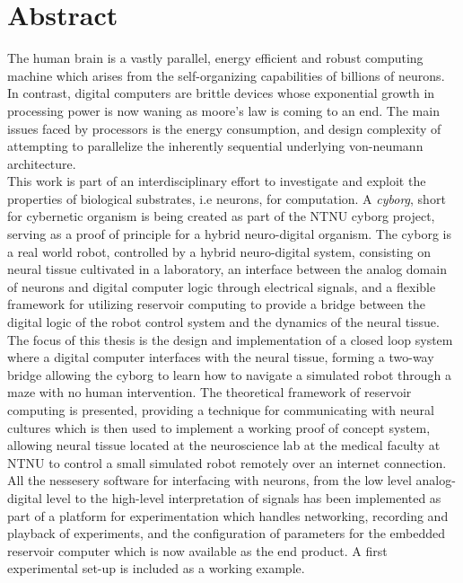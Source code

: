 \section*{\Huge Abstract}
The human brain is a vastly parallel, energy efficient and robust computing
machine which arises from the self-organizing capabilities of billions of neurons.
In contrast, digital computers are brittle devices whose exponential growth in
processing power is now waning as moore's law is coming to an end.
The main issues faced by processors is the energy consumption, and design
complexity of attempting to parallelize the inherently sequential underlying
von-neumann architecture.\\
This work is part of an interdisciplinary effort to investigate and exploit the
properties of biological substrates, i.e neurons, for computation.
%
A \emph{cyborg}, short for cybernetic organism is being created as part of the NTNU
cyborg project, serving as a proof of principle for a hybrid neuro-digital organism.
%
The cyborg is a real world robot, controlled by a hybrid neuro-digital system,
consisting on neural tissue cultivated in a laboratory, an interface between the
analog domain of neurons and digital computer logic through electrical signals,
and a flexible framework for utilizing reservoir computing to provide a bridge
between the digital logic of the robot control system and the dynamics of the
neural tissue.\\
%
The focus of this thesis is the design and implementation of a closed loop
system where a digital computer interfaces with the neural tissue, forming a
two-way bridge allowing the cyborg to learn how to navigate a simulated robot
through a maze with no human intervention.
The theoretical framework of reservoir computing is presented, providing a technique
for communicating with neural cultures which is then used to implement a working
proof of concept system, allowing neural tissue located at the neuroscience lab
at the medical faculty at NTNU to control a small simulated robot remotely over an
internet connection.
All the nessesery software for interfacing with neurons, from the low level
analog-digital level to the high-level interpretation of signals has been
implemented as part of a platform for experimentation which handles networking,
recording and playback of experiments, and the configuration of parameters for
the embedded reservoir computer which is now available as the end product.
A first experimental set-up is included as a working example.
